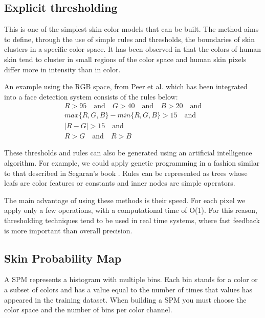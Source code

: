 \documentclass[12pt]{report}
\begin{document}
	\subsection{Explicit thresholding}
	This is one of the simplest skin-color models that can be built. The method aims to define, through the use of simple rules and thresholds, the boundaries of skin clusters in a specific color space. It has been observed in \cite{threshold_cluster} that the colors of human skin tend to cluster in small regions of the color space and human skin pixels differ more in intensity than in color.
	
	An example using the RGB space, from Peer et al.\cite{rgb_threshold} which has been integrated into a face detection system consists of the rules below:
	\begin{equation}
	\begin{split}
	R > 95 \quad \textrm{and} \quad G > 40 \quad \textrm{and} \quad B > 20 \quad \textrm{and} \\ 
	max\{R, G, B\} - min\{R, G, B\} > 15 \quad \textrm{and}\\
	|R - G| > 15 \quad \textrm{and}\\
	R > G \quad \textrm{and} \quad R > B
	\end{split}
	\end{equation}
	
	These thresholds and rules can also be generated using an artificial intelligence algorithm. For example, we could apply genetic programming in a fashion similar to that described in Segaran's book \cite{programming_collective_intelligence}. Rules can be represented as trees whose leafs are color features or constants and inner nodes are simple operators.
	
	The main advantage of using these methods is their speed. For each pixel we apply only a few operations, with a computational time of O(1). For this reason, thresholding techniques tend to be used in real time systems, where fast feedback is more important than overall precision.
	
	\subsection{Skin Probability Map}
	A SPM represents a histogram with multiple bins. Each bin stands for a color or a subset of colors and has a value equal to the number of times that values has appeared in the training dataset. When building a SPM you must choose the color space and the number of bins per color channel.
	
\end{document}
